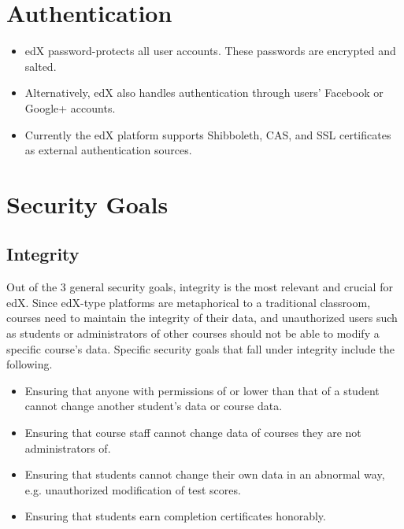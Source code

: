 \documentclass[11pt]{article}
\begin{document}
\section{Authentication}
\begin{itemize}
\item edX password-protects all user accounts. These passwords are encrypted and salted. 
\item Alternatively, edX also handles authentication through users' Facebook or Google+ accounts.
\item Currently the edX platform supports Shibboleth, CAS, and SSL certificates as external authentication sources.
\end{itemize}

\section{Security Goals}

\subsection{Integrity}
Out of the 3 general security goals, integrity is the most relevant and crucial for edX. Since edX-type platforms are metaphorical to a traditional classroom, courses need to maintain the integrity of their data, and unauthorized users such as students or administrators of other courses should not be able to modify a specific course's data. Specific security goals that fall under integrity include the following.
\begin{itemize}
\item Ensuring that anyone with permissions of or lower than that of a student cannot change another student's data or course data.
\item Ensuring that course staff cannot change data of courses they are not administrators of.
\item Ensuring that students cannot change their own data in an abnormal way, e.g. unauthorized modification of test scores.
\item Ensuring that students earn completion certificates honorably.
\end{itemize}
\end{document}
